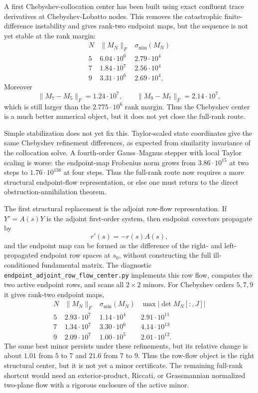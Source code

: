 \documentclass[11pt]{article}
\begin{document}
A first Chebyshev-collocation center has been built using exact confluent
trace derivatives at Chebyshev-Lobatto nodes.  This removes the catastrophic
finite-difference instability and gives rank-two endpoint maps, but the
sequence is not yet stable at the rank margin:
\[
\begin{array}{c|c|c}
N & \|M_N\|_F & \sigma_{\min}(M_N)\\
\hline
5 & 6.04\cdot10^6 & 2.79\cdot10^4\\
7 & 1.84\cdot10^7 & 2.56\cdot10^4\\
9 & 3.31\cdot10^6 & 2.69\cdot10^4 .
\end{array}
\]
Moreover
\[
  \|M_7-M_5\|_F=1.24\cdot10^7,\qquad
  \|M_9-M_7\|_F=2.14\cdot10^7,
\]
which is still larger than the \(2.775\cdot10^6\) rank margin.  Thus the
Chebyshev center is a much better numerical object, but it does not yet close
the full-rank route.

Simple stabilization does not yet fix this.  Taylor-scaled state coordinates
give the same Chebyshev refinement differences, as expected from similarity
invariance of the collocation solve.  A fourth-order Gauss--Magnus stepper
with local Taylor scaling is worse: the endpoint-map Frobenius norm grows from
\(3.86\cdot10^{15}\) at two steps to \(1.76\cdot10^{138}\) at four steps.
Thus the full-rank route now requires a more structural endpoint-flow
representation, or else one must return to the direct
obstruction-annihilation theorem.

The first structural replacement is the adjoint row-flow representation.  If
\(Y'=A(s)Y\) is the adjoint first-order system, then endpoint covectors
propagate by
\[
  r'(s)=-r(s)A(s),
\]
and the endpoint map can be formed as the difference of the right- and
left-propagated endpoint row spaces at \(s_0\), without constructing the full
ill-conditioned fundamental matrix.  The diagnostic
\texttt{endpoint\_adjoint\_row\_flow\_center.py} implements this row flow, computes the
two active endpoint rows, and scans all \(2\times2\) minors.  For Chebyshev
orders \(5,7,9\) it gives rank-two endpoint maps,
\[
\begin{array}{c|c|c|c}
N & \|M_N\|_F & \sigma_{\min}(M_N) & \max |\det M_N[:,J]|\\
\hline
5 & 2.93\cdot10^7 & 1.14\cdot10^4 & 2.91\cdot10^{11}\\
7 & 1.34\cdot10^7 & 3.30\cdot10^6 & 4.14\cdot10^{13}\\
9 & 2.09\cdot10^7 & 1.00\cdot10^5 & 2.01\cdot10^{12}.
\end{array}
\]
The same best minor persists under these refinements, but its relative change
is about \(1.01\) from \(5\) to \(7\) and \(21.6\) from \(7\) to \(9\).
Thus the row-flow object is the right structural center, but it is not yet a
minor certificate.  The remaining full-rank shortcut would need an
exterior-product, Riccati, or Grassmannian normalized two-plane flow with a
rigorous enclosure of the active minor.
\end{document}
